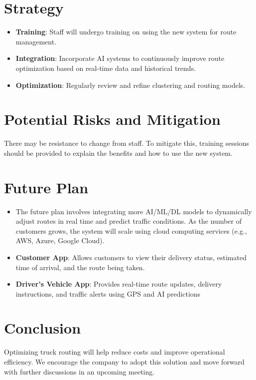\documentclass[a4paper,12pt, final]{article}
\begin{document}
\section{Strategy}
\begin{itemize}
    \item \textbf{Training}: Staff will undergo training on using the new system for route management.
    \item \textbf{Integration}: Incorporate AI systems to continuously improve route optimization based on real-time data and historical trends.
    \item \textbf{Optimization}: Regularly review and refine clustering and routing models.
\end{itemize}


\section{Potential Risks and Mitigation}
There may be resistance to change from staff. To mitigate this, training sessions should be provided
to explain the benefits and how to use the new system.

\section{Future Plan}
\begin{itemize}
\item The future plan involves integrating more AI/ML/DL models to dynamically adjust routes in real time and predict traffic conditions. As the number of customers grows, the system will scale using cloud computing services (e.g., AWS, Azure, Google Cloud).
\item \textbf{Customer App}: Allows customers to view their delivery status, estimated time of arrival, and the route being taken.
\item \textbf{Driver's Vehicle App}: Provides real-time route updates, delivery instructions, and traffic alerts using GPS and AI predictions
\end{itemize}



\section{Conclusion}
Optimizing truck routing will help reduce costs and improve operational efficiency. We encourage
the company to adopt this solution and move forward with further discussions in an upcoming
meeting.





\end{document}
